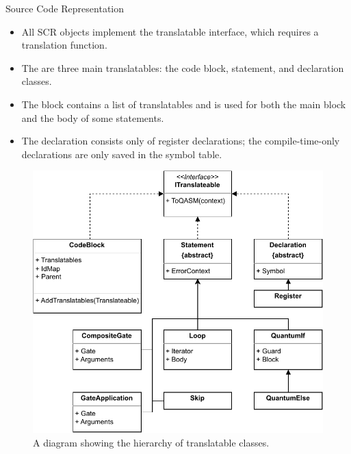 \begin{frame}{Source Code Representation}
    \begin{minipage}{.45\textwidth}
        \begin{itemize}
            \item All SCR objects implement the translatable interface, which requires a translation function.
            \item The are three main translatables: the code block, statement, and declaration classes.
            \item The block contains a list of translatables and is used for both the main block and the body of some statements.
            \item The declaration consists only of register declarations; the compile-time-only declarations are only saved in the symbol table. 
        \end{itemize}    
    \end{minipage}
    \begin{minipage}{.50\textwidth}
        \centering
        \begin{figure}[htp]
            \centering
            \includegraphics[]{../figures/drawio/slides/uml_translateables.pdf}
            \caption{A diagram showing the hierarchy of translatable classes.}
        \end{figure}
    \end{minipage}
\end{frame}

